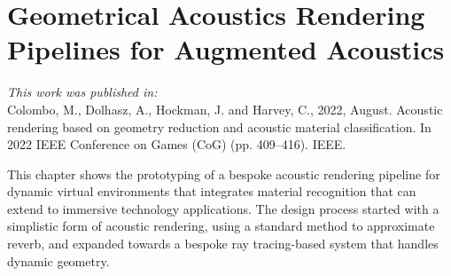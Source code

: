 \chapter{Geometrical Acoustics Rendering Pipelines for Augmented Acoustics}\label{ch:acoustic-rendering} %

\textit{This work was published in:}\\

Colombo, M., Dolhasz, A., Hockman, J. and Harvey, C., 2022, August. Acoustic rendering based on geometry reduction and acoustic material classification. In 2022 IEEE Conference on Games (CoG) (pp. 409--416). IEEE.\\
\bigskip

This chapter shows the prototyping of a bespoke acoustic rendering pipeline for dynamic virtual environments that integrates material recognition that can extend to immersive technology applications. The design process started with a simplistic form of acoustic rendering, using a standard method to approximate reverb, and expanded towards a bespoke ray tracing-based system that handles dynamic geometry.

